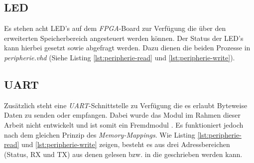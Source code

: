         
        \newpage
        
        

        \subsection{LED}
            Es stehen acht LED's auf dem \textit{FPGA}-Board zur Verfügung die über den erweiterten Speicherbereich
            angesteuert werden können. Der Status der LED's kann hierbei gesetzt sowie abgefragt werden.
            Dazu dienen die beiden Prozesse in \textit{peripherie.vhd} (Siehe Listing \ref{lst:peripherie-read} und \ref{lst:peripherie-write}).

        \subsection{UART}
            Zusätzlich steht eine \textit{UART}-Schnittstelle zu Verfügung die es erlaubt Byteweise Daten
            zu senden oder empfangen.
            Dabei wurde das Modul im Rahmen dieser Arbeit nicht entwickelt und ist somit ein Fremdmodul \cite{vhdl-uart}.
            Es funktioniert jedoch nach dem gleichen Prinzip des \textit{Memory-Mappings}.
            Wie Listing \ref{lst:peripherie-read} und \ref{lst:peripherie-write} zeigen,
            besteht es aus drei Adressbereichen (Status, RX und TX) aus denen gelesen bzw. in die geschrieben werden kann.
            

